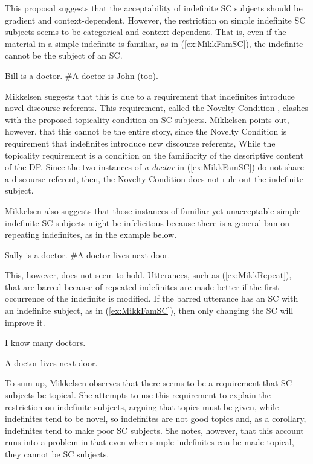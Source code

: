 \documentclass[
]{RCL}
\begin{document}
This proposal suggests that the acceptability of indefinite SC subjects should be gradient and context-dependent.
However, the restriction on simple indefinite SC subjects seems to be categorical and context-dependent.
That is, even if the material in a simple indefinite is familiar, as in (\ref{ex:MikkFamSC}), the indefinite cannot be the subject of an SC.
\begin{exe}
	\ex\label{ex:MikkFamSC} Bill is a doctor. \#A doctor is John (too).
\end{exe}
Mikkelsen suggests that this is due to a requirement that indefinites introduce novel discourse referents.
This requirement, called the Novelty Condition \citep{heim1982semantics}, clashes with the proposed topicality condition on SC subjects.
Mikkelsen points out, however, that this cannot be the entire story, since the Novelty Condition is requirement that indefinites introduce new discourse referents, While the topicality requirement is a condition on the familiarity of the descriptive content of the DP.
Since the two instances of \textit{a doctor} in (\ref{ex:MikkFamSC}) do not share a discourse referent, then, the Novelty Condition does not rule out the indefinite subject.

Mikkelsen also suggests that those instances of familiar yet unacceptable simple indefinite SC subjects might be infelicitous because there is a general ban on repeating indefinites, as in the example below.
\begin{exe}
	\ex\label{ex:MikkRepeat} Sally is a doctor. \#A doctor lives next door.
\end{exe}
This, however, does not seem to hold.
Utterances, such as (\ref{ex:MikkRepeat}), that are barred because of repeated indefinites are made better if the first occurrence of the indefinite is modified.
If the barred utterance has an SC with an indefinite subject, as in (\ref{ex:MikkFamSC}), then only changing the SC will improve it.
\begin{exe}
\ex\label{ex:IndefGiven} I know many doctors.
\begin{xlist}
	\ex A doctor lives next door.
\end{xlist}
\end{exe}
To sum up, Mikkelsen observes that there seems to be a requirement that SC subjects be topical.
She attempts to use this requirement to explain the restriction on indefinite subjects, arguing that topics must be given, while indefinites tend to be novel, so indefinites are not good topics and, as a corollary, indefinites tend to make poor SC subjects.
She notes, however, that this account runs into a problem in that even when simple indefinites can be made topical, they cannot be SC subjects.
\end{document}
